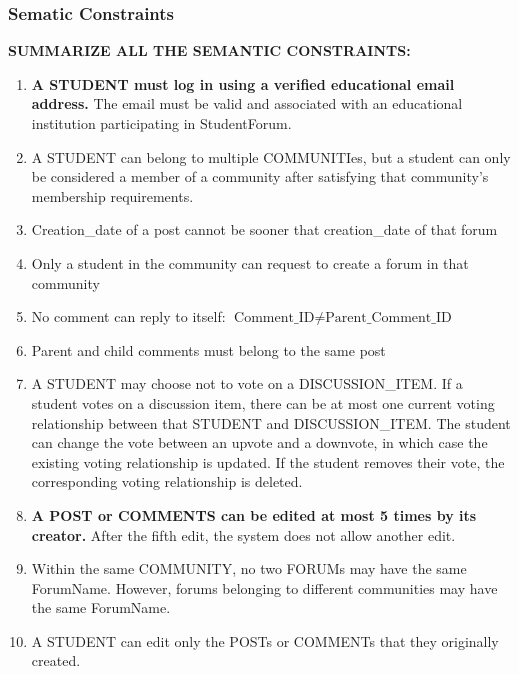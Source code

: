 \subsubsection{Sematic Constraints}
\noindent\textbf{SUMMARIZE ALL THE SEMANTIC CONSTRAINTS:}

\begin{enumerate}[]
    \item \textbf{A STUDENT must log in using a verified educational email address.} The email must be valid and associated with an educational institution participating in StudentForum.
    \item A STUDENT can belong to multiple COMMUNITIes, but a student can only be considered a member of a community after satisfying that community's membership requirements.
    \item Creation\_date of a post cannot be sooner that creation\_date of that forum
    \item Only a student in the community can request to create a forum in that community
    \item No comment can reply to itself: $\text{Comment\_ID} \neq \text{Parent\_Comment\_ID}$
    \item Parent and child comments must belong to the same post
    \item A STUDENT may choose not to vote on a DISCUSSION\_ITEM. If a student votes on a discussion item, there can be at most one current voting relationship between that STUDENT and DISCUSSION\_ITEM. The student can change the vote between an upvote and a downvote, in which case the existing voting relationship is updated. If the student removes their vote, the corresponding voting relationship is deleted.
    \item \textbf{A POST or COMMENTS can be edited at most 5 times by its creator.} After the fifth edit, the system does not allow another edit.
    \item Within the same COMMUNITY, no two FORUMs may have the same ForumName. However, forums belonging to different communities may have the same ForumName.
    \item A STUDENT can edit only the POSTs or COMMENTs that they originally created.
\end{enumerate}

